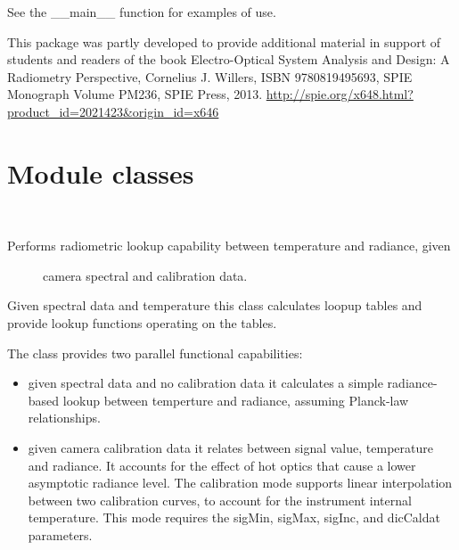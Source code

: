 \documentclass[a4paper,10pt,english]{sphinxmanual}
\begin{document}
See the \_\_main\_\_ function for examples of use.

This package was partly developed to provide additional material in support of students
and readers of the book Electro-Optical System Analysis and Design: A Radiometry
Perspective,  Cornelius J. Willers, ISBN 9780819495693, SPIE Monograph Volume
PM236, SPIE Press, 2013.  \href{http://spie.org/x648.html?product\_id=2021423\&origin\_id=x646}{http://spie.org/x648.html?product\_id=2021423\&origin\_id=x646}


\section{Module classes}
\label{rylookup:module-classes}

\begin{fulllineitems}
\label{rylookup:pyradi.rylookup.RadLookup}~\begin{description}
\item[{Performs radiometric lookup capability between temperature and radiance, given}] \leavevmode
camera spectral and calibration data.

\end{description}

Given spectral data and temperature this class calculates loopup tables and
provide lookup functions operating on the tables.

The class provides two parallel functional capabilities:
\begin{itemize}
\item {} 
given spectral data and no calibration data it calculates a simple radiance-based
lookup between temperture and radiance, assuming Planck-law relationships.

\item {} 
given camera calibration data it relates between signal value, temperature and
radiance.  It accounts for the effect of hot optics that cause a lower asymptotic
radiance level.  The calibration mode supports linear interpolation between two
calibration curves, to account for the instrument internal temperature. This
mode requires the sigMin, sigMax, sigInc, and dicCaldat parameters.


\end{itemize}
\end{fulllineitems}
\end{document}
